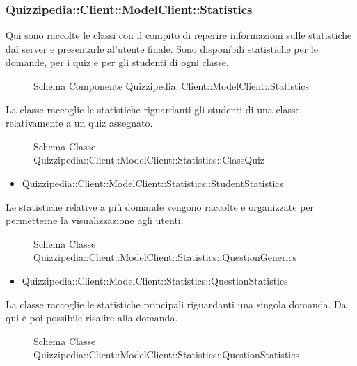 \subsubsection{Quizzipedia::Client::ModelClient::Statistics}
Qui sono raccolte le classi con il compito di reperire informazioni sulle statistiche dal server e presentarle al'utente finale. Sono disponibili statistiche per le domande, per i quiz e per gli studenti di ogni classe.
\begin{figure}[H]
\centering
\noindent{}
\caption{Schema Componente Quizzipedia::Client::ModelClient::Statistics}
\end{figure}
La classe raccoglie le statistiche riguardanti gli studenti di una classe relativamente a un quiz assegnato.
\begin{figure}[H]
\centering
\noindent{}
\caption{Schema Classe Quizzipedia::Client::ModelClient::Statistics::ClassQuiz}
\end{figure}
\begin{itemize}
\item Quizzipedia::Client::ModelClient::Statistics::StudentStatistics
\end{itemize}
Le statistiche relative a più domande vengono raccolte e organizzate per permetterne la visualizzazione agli utenti.
\begin{figure}[H]
\centering
\noindent{}
\caption{Schema Classe Quizzipedia::Client::ModelClient::Statistics::QuestionGenerics}
\end{figure}
\begin{itemize}
\item Quizzipedia::Client::ModelClient::Statistics::QuestionStatistics
\end{itemize}
La classe raccoglie le statistiche principali riguardanti una singola domanda. Da qui è poi possibile risalire alla domanda.
\begin{figure}[H]
\centering
\noindent{}
\caption{Schema Classe Quizzipedia::Client::ModelClient::Statistics::QuestionStatistics}
\end{figure}
